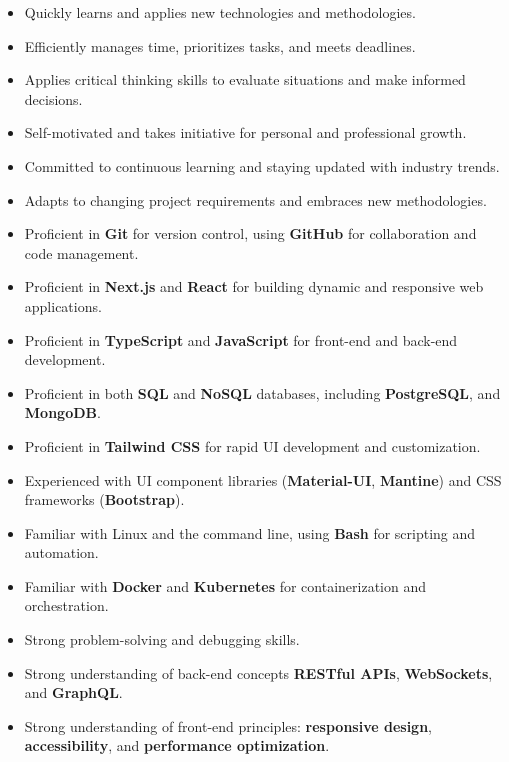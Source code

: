 \documentclass[9pt,a4paper,withhyper]{altacv}
\begin{document}
\begin{paracol}{2}
	\begin{itemize}
		\item Quickly learns and applies new technologies and methodologies.
		\item Efficiently manages time, prioritizes tasks, and meets deadlines.
		\item Applies critical thinking skills to evaluate situations and make informed decisions.
		\item Self-motivated and takes initiative for personal and professional growth.
		\item Committed to continuous learning and staying updated with industry trends.
		\item Adapts to changing project requirements and embraces new methodologies.
	\end{itemize}
	
	\divider
		
	\begin{itemize}
		\item Proficient in \textbf{Git} for version control, using \textbf{GitHub} for collaboration and code management.
		\item Proficient in \textbf{Next.js} and \textbf{React} for building dynamic and responsive web applications.
		\item Proficient in \textbf{TypeScript} and \textbf{JavaScript} for front-end and back-end development.
		\item Proficient in both \textbf{SQL} and \textbf{NoSQL} databases, including \textbf{PostgreSQL}, and \textbf{MongoDB}.
		\item Proficient in \textbf{Tailwind CSS} for rapid UI development and customization.
		\item Experienced with UI component libraries (\textbf{Material-UI}, \textbf{Mantine}) and CSS frameworks (\textbf{Bootstrap}).
		\item Familiar with Linux and the command line, using \textbf{Bash} for scripting and automation.
		\item Familiar with \textbf{Docker} and \textbf{Kubernetes} for containerization and orchestration.
		\item Strong problem-solving and debugging skills.
		\item Strong understanding of back-end concepts \textbf{RESTful APIs}, \textbf{WebSockets}, and \textbf{GraphQL}.
		\item Strong understanding of front-end principles: \textbf{responsive design}, \textbf{accessibility}, and \textbf{performance optimization}.
	\end{itemize}
\end{paracol}
\end{document}
